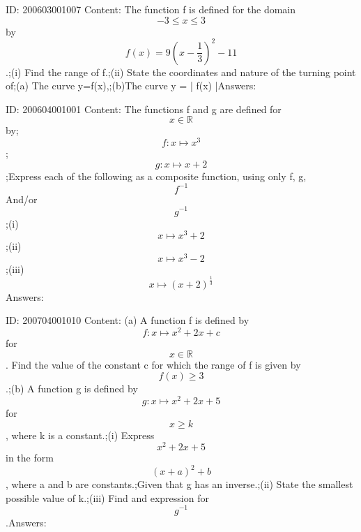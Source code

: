 \documentclass{article}
\begin{document}
ID: 200603001007
Content:
The function f is defined for the domain $$-3\leq x\leq3$$ by $$f(x)=9(x-\frac{1}{3})^2-11$$.;(i)	Find the range of f.;(ii) State the coordinates and nature of the turning point of;(a) The curve y=f(x),;(b)The curve y = | f(x) |Answers:

ID: 200604001001
Content:
The functions f and g are defined for $$ x\in \mathbb{R} $$ by;$$f:x \mapsto  x^3$$;$$g:x \mapsto x+2$$;Express each of the following as a composite function, using only f, g, $$f^{-1}$$ And/or $$g^{-1}$$;(i) $$ x \mapsto  x^3+2$$;(ii) $$ x \mapsto  x^3-2$$;(iii) $$ x \mapsto  (x+2)^{\frac{1}{3}}$$Answers:

ID: 200704001010
Content:
(a)	A function f is defined by $$f:x \mapsto x^2+2x+c$$ for $$x \in \mathbb{R}$$. Find the value of the constant c for which the range of f is given by $$f(x)\geq3$$.;(b)	A function g is defined by $$g:x \mapsto x^2+2x+5$$ for $$x\geq k$$, where k is a constant.;(i)	Express $$x^2+2x+5$$ in the form $$(x+a)^2+b$$, where a and b are constants.;Given that g has an inverse.;(ii)	State the smallest possible value of k.;(iii)	Find and expression for $$g^{-1}$$.Answers:
\end{document}
